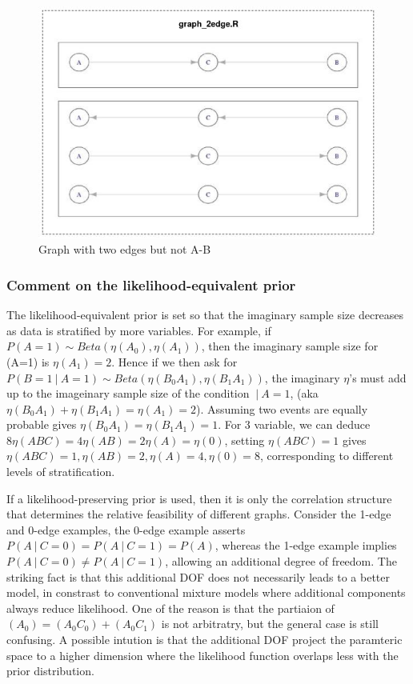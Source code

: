 \documentclass[]{article}
\newcommand\gvn[1][]{\:#1\vert\:}
\theoremstyle{definition}
\theoremstyle{definition}
\theoremstyle{definition}
\theoremstyle{remark}
\begin{document}
\begin{figure}
\centering
\includegraphics[height=0.50000\textwidth]{graph_2edge.jpg}
\caption{Graph with two edges but not A-B}
\end{figure}

\subsubsection{Comment on the likelihood-equivalent
prior}\label{comment-on-the-likelihood-equivalent-prior}

The likelihood-equivalent prior is set so that the imaginary sample size
decreases as data is stratified by more variables. For example, if
\(P(A=1) \sim Beta(\eta(A_0),\eta(A_1))\), then the imaginary sample
size for (A=1) is \(\eta(A_1)=2\). Hence if we then ask for
\(P(B=1\gvn A=1)\sim Beta(\eta(B_0A_1),\eta(B_1A_1))\), the imaginary
\(\eta\)'s must add up to the imageinary sample size of the condition
\(\gvn A=1\), (aka \(\eta(B_0A_1)+\eta(B_1A_1)=\eta(A_1)=2\)). Assuming
two events are equally probable gives \(\eta(B_0A_1)=\eta(B_1A_1)=1\).
For 3 variable, we can deduce \(8\eta(ABC)=4\eta(AB)=2\eta(A)=\eta(0)\),
setting \(\eta(ABC)=1\) gives
\(\eta(ABC)=1,\eta(AB)=2,\eta(A)=4,\eta(0)=8\), corresponding to
different levels of stratification.

If a likelihood-preserving prior is used, then it is only the
correlation structure that determines the relative feasibility of
different graphs. Consider the 1-edge and 0-edge examples, the 0-edge
example asserts \(P(A\gvn C=0)=P(A\gvn C=1)=P(A)\), whereas the 1-edge
example implies \(P(A\gvn C=0)\neq P(A\gvn C=1)\), allowing an
additional degree of freedom. The striking fact is that this additional
DOF does not necessarily leads to a better model, in constrast to
conventional mixture models where additional components always reduce
likelihood. One of the reason is that the partiaion of
\((A_0)=(A_0C_0)+(A_0C_1)\) is not arbitratry, but the general case is
still confusing. A possible intution is that the additional DOF project
the paramteric space to a higher dimension where the likelihood function
overlaps less with the prior distribution.
\end{document}
